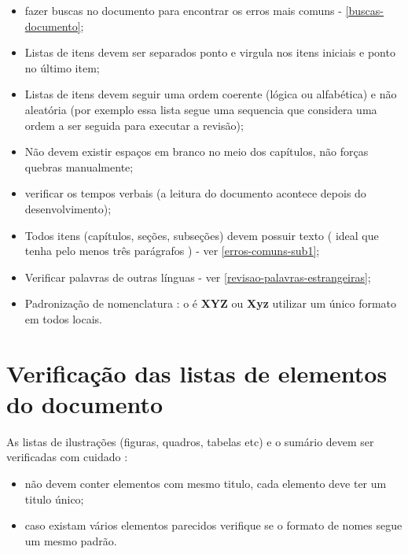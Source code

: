 \begin{itemize}
    \item fazer buscas no documento para encontrar os erros mais comuns - \autoref{buscas-documento};
    
    \item Listas de itens devem ser separados ponto e virgula nos itens iniciais e ponto no último item;
    
    \item Listas de itens devem seguir uma ordem coerente (lógica ou alfabética) e não aleatória (por exemplo essa lista segue uma sequencia que considera uma ordem a ser seguida para executar a revisão);
    
    \item Não devem existir espaços em branco no meio dos capítulos, não forças quebras manualmente;
    
    \item verificar os tempos verbais (a leitura do documento acontece depois do desenvolvimento);
    
    \item Todos itens (capítulos, seções, subseções) devem possuir texto ( ideal que tenha pelo menos três parágrafos ) - ver \autoref{erros-comuns-sub1};

    \item Verificar palavras de outras línguas - ver \autoref{revisao-palavras-estrangeiras};
    
    \item Padronização de nomenclatura : o é \textbf{XYZ} ou \textbf{Xyz} utilizar um único formato em todos locais.
    
\end{itemize}

\section{Verificação das listas de elementos do documento}
\label{revisao-listas}

As listas de ilustrações (figuras, quadros, tabelas etc) e o sumário devem ser verificadas com cuidado :

\begin{itemize}
    \item não devem conter elementos com mesmo titulo, cada elemento deve ter um titulo único;
    
    \item caso existam vários elementos parecidos verifique se o formato de nomes segue um mesmo padrão.
    
\end{itemize}

